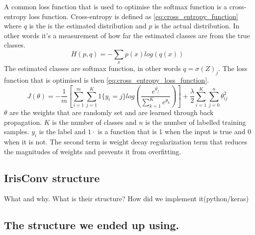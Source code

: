 A common loss function that is used to optimise the softmax function is a cross-entropy loss function. Cross-entropy is defined as \autoref{eq:cross_entropy_function} where $q$ is the is the estimated distribution and $p$ is the actual distribution. In other words it's a measurement of how far the estimated classes are from the true classes.
\begin{equation}
\label{eq:cross_entropy_function}
H(p,q) = -\sum_{x}p(x)log(q(x))
\end{equation}
The estimated classes are softmax function, in other words $q = \sigma(Z)_{j} $. The loss function that is optimised is then \autoref{eq:cross_entropy_loss_function}.
\begin{equation}
\label{eq:cross_entropy_loss_function}
J(\theta) = -\frac{1}{m}\left[ \sum_{i=1}^{m}\sum_{j=1}^{K} 1\{y_i=j\}  log\left( \frac{e^{\theta_j}}{\sum_{k=1}^{K}e^{\theta_k}} \right)\right] + \frac{\lambda}{2} \sum_{i=1}^{K} \sum_{j=0}^{n} \theta_{ij}^{2}
\end{equation}
$\theta$ are the weights that are randomly set and are learned through back propagation. $K$ is the number of classes and $n$ is the number of labelled training samples. $y_i$ is the label and $1{\cdot}$ is a function that is 1 when the input is true and 0 when it is not. The second term is weight decay regularization term that reduces the magnitudes of weights and prevents it from overfitting.


\subsection{IrisConv structure}
What and why. What is their structure? How did we implement it(python/keras)

\subsection{The structure we ended up using.}
